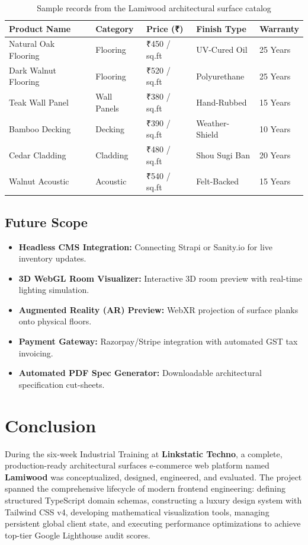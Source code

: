 \documentclass[12pt,a4paper]{report}
\begin{document}
\begin{table}[htbp]
\centering
\caption{Sample records from the Lamiwood architectural surface catalog}
\label{tab:catalog}
\begin{tabular}{lllll}
\toprule
\textbf{Product Name} & \textbf{Category} & \textbf{Price (₹)} & \textbf{Finish Type} & \textbf{Warranty} \\
\midrule
Natural Oak Flooring & Flooring & ₹450 / sq.ft & UV-Cured Oil & 25 Years \\
Dark Walnut Flooring & Flooring & ₹520 / sq.ft & Polyurethane & 25 Years \\
Teak Wall Panel & Wall Panels & ₹380 / sq.ft & Hand-Rubbed & 15 Years \\
Bamboo Decking & Decking & ₹390 / sq.ft & Weather-Shield & 10 Years \\
Cedar Cladding & Cladding & ₹480 / sq.ft & Shou Sugi Ban & 20 Years \\
Walnut Acoustic & Acoustic & ₹540 / sq.ft & Felt-Backed & 15 Years \\
\bottomrule
\end{tabular}
\end{table}

\section{Future Scope}
\begin{itemize}
    \item \textbf{Headless CMS Integration:} Connecting Strapi or Sanity.io for live inventory updates.
    \item \textbf{3D WebGL Room Visualizer:} Interactive 3D room preview with real-time lighting simulation.
    \item \textbf{Augmented Reality (AR) Preview:} WebXR projection of surface planks onto physical floors.
    \item \textbf{Payment Gateway:} Razorpay/Stripe integration with automated GST tax invoicing.
    \item \textbf{Automated PDF Spec Generator:} Downloadable architectural specification cut-sheets.
\end{itemize}

\chapter*{Conclusion}
During the six-week Industrial Training at \textbf{Linkstatic Techno}, a complete, production-ready architectural surfaces e-commerce web platform named \textbf{Lamiwood} was conceptualized, designed, engineered, and evaluated. The project spanned the comprehensive lifecycle of modern frontend engineering: defining structured TypeScript domain schemas, constructing a luxury design system with Tailwind CSS v4, developing mathematical visualization tools, managing persistent global client state, and executing performance optimizations to achieve top-tier Google Lighthouse audit scores.
\end{document}
